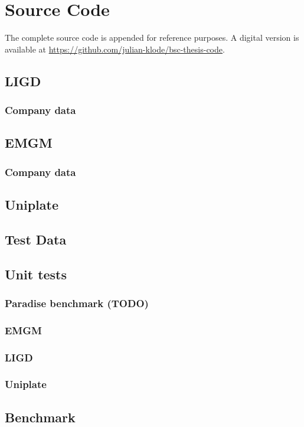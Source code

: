 \chapter{Source Code}

The complete source code is appended for reference purposes. A digital version
is available at \url{https://github.com/julian-klode/bsc-thesis-code}.

\lstset{frame=none}
\section{LIGD}

\subsection{Company data}

\section{EMGM}

\subsection{Company data}

\section{Uniplate}

\section{Test Data}

\section{Unit tests}
\subsection{Paradise benchmark (TODO)}

\subsection{EMGM}

\subsection{LIGD}

\subsection{Uniplate}


\section{Benchmark}

